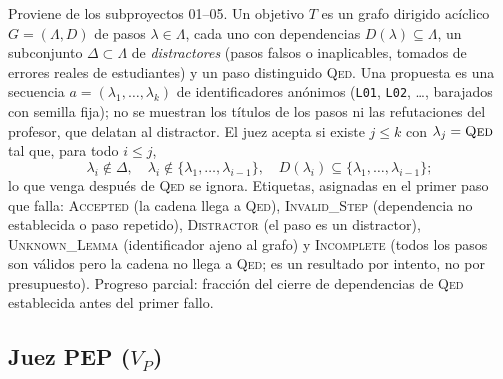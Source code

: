\documentclass[11pt,a4paper]{article}
\begin{document}
Proviene de los subproyectos 01--05. Un objetivo $T$ es un grafo dirigido acíclico $G = (\Lambda, D)$ de pasos $\lambda \in \Lambda$, cada uno con dependencias $D(\lambda) \subseteq \Lambda$, un subconjunto $\Delta \subset \Lambda$ de \emph{distractores} (pasos falsos o inaplicables, tomados de errores reales de estudiantes) y un paso distinguido \textsc{Qed}. Una propuesta es una secuencia $a = (\lambda_1, \dots, \lambda_k)$ de identificadores anónimos (\texttt{L01}, \texttt{L02}, \dots, barajados con semilla fija); no se muestran los títulos de los pasos ni las refutaciones del profesor, que delatan al distractor. El juez acepta si existe $j \le k$ con $\lambda_j = \textsc{Qed}$ tal que, para todo $i \le j$,
\[
  \lambda_i \notin \Delta,\quad \lambda_i \notin \{\lambda_1,\dots,\lambda_{i-1}\},\quad D(\lambda_i) \subseteq \{\lambda_1,\dots,\lambda_{i-1}\};
\]
lo que venga después de \textsc{Qed} se ignora. Etiquetas, asignadas en el primer paso que falla: \textsc{Accepted} (la cadena llega a \textsc{Qed}), \textsc{Invalid\_Step} (dependencia no establecida o paso repetido), \textsc{Distractor} (el paso es un distractor), \textsc{Unknown\_Lemma} (identificador ajeno al grafo) y \textsc{Incomplete} (todos los pasos son válidos pero la cadena no llega a \textsc{Qed}; es un resultado por intento, no por presupuesto). Progreso parcial: fracción del cierre de dependencias de \textsc{Qed} establecida antes del primer fallo.

\subsection{Juez PEP ($V_P$)}
\end{document}
